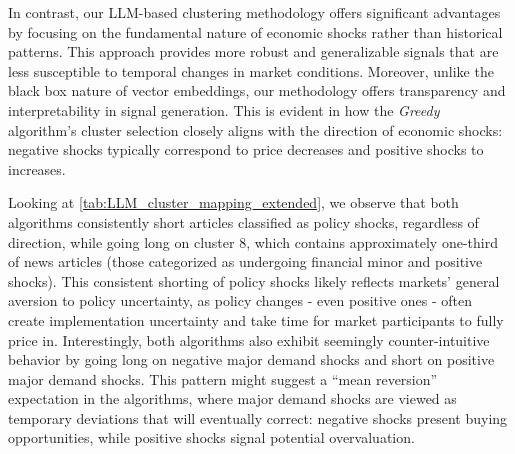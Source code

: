 
In contrast, our LLM-based clustering methodology offers significant advantages by focusing on the fundamental nature of economic shocks rather than historical patterns. This approach provides more robust and generalizable signals that are less susceptible to temporal changes in market conditions. Moreover, unlike the black box nature of vector embeddings, our methodology offers transparency and interpretability in signal generation. This is evident in how the \textit{Greedy} algorithm's cluster selection closely aligns with the direction of economic shocks: negative shocks typically correspond to price decreases and positive shocks to increases. 

Looking at \cref{tab:LLM_cluster_mapping_extended}, we observe that both algorithms consistently short articles classified as policy shocks, regardless of direction, while going long on cluster 8, which contains approximately one-third of news articles (those categorized as undergoing financial minor and positive shocks). This consistent shorting of policy shocks likely reflects markets' general aversion to policy uncertainty, as policy changes - even positive ones - often create implementation uncertainty and take time for market participants to fully price in. Interestingly, both algorithms also exhibit seemingly counter-intuitive behavior by going long on negative major demand shocks and short on positive major demand shocks. This pattern might suggest a ``mean reversion'' expectation in the algorithms, where major demand shocks are viewed as temporary deviations that will eventually correct: negative shocks present buying opportunities, while positive shocks signal potential overvaluation.

